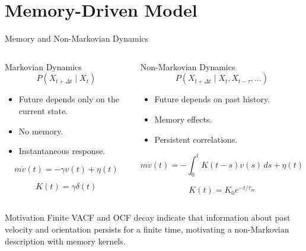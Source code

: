 \section{Memory-Driven Model}
\begin{frame}{Memory and Non-Markovian Dynamics}
	\vspace{-0.4cm}

	\begin{columns}[T]


		\begin{block}{Markovian Dynamics}
			\[
				P(X_{t+\Delta t}\mid X_t)
			\]

			\begin{itemize}
				\item Future depends only on the current state.
				\item No memory.
				\item Instantaneous response.
			\end{itemize}
			\vspace{-0.6cm}

			\[
				m\dot v(t)=-\gamma v(t)+\eta(t)
			\]
			\vspace{-0.8cm}

			\[
				K(t)=\gamma\delta(t)
			\]

		\end{block}


		\begin{block}{Non-Markovian Dynamics}
			\[
				P(X_{t+\Delta t}\mid X_t,X_{t-\tau},\ldots)
			\]

			\begin{itemize}
				\item Future depends on past history.
				\item Memory effects.
				\item Persistent correlations.
			\end{itemize}
			\vspace{-0.8cm}

			\[
				m\dot v(t)
				=
				-\int_0^t K(t-s)v(s)\,ds
				+\eta(t)
			\]
			\vspace{-0.8cm}

			\[
				K(t)=K_0e^{-t/\tau_m}
			\]

		\end{block}

	\end{columns}

	\vspace{0.3cm}

	\begin{alertblock}{Motivation}
		Finite VACF and OCF decay indicate that information about past
		velocity and orientation persists for a finite time, motivating
		a non-Markovian description with memory kernels.
	\end{alertblock}

\end{frame}
